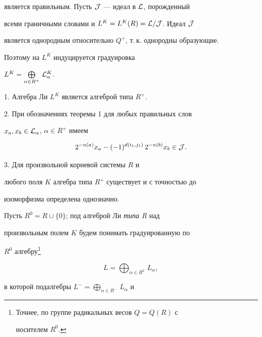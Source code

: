 является правильным. Пусть $\cal J$ --- идеал в $\cal L$, порожденный


всеми граничными словами и $L^K=L^K(R)=\cal L/J$. Идеал $\cal J$


является однородным относительно $Q^+$, т.\,к. однородны образующие.


Поэтому на $L^K$ индуцируется градуировка


$L^K=\bigoplus\limits_{\alpha\in R^+}\,{\cal L}_\alpha^K$.





\begin{cor}


1. Алгебра Ли $L^K$ является алгеброй типа $R^+$.





2. При обозначениях теоремы 1 для любых правильных слов


$x_a,x_b\in {\cal L}_\alpha$, $\alpha\in R^+$ имеем


$$


2^{-u(a)}x_a-(-1)^{d(i_1,j_1)}\,2^{-u(b)}x_b\in{\cal J}.


$$





3. Для произвольной корневой системы $R$ и


любого поля $K$ алгебра типа $R^+$ существует и с точностью до


изоморфизма определена однозначно.


\end{cor}


\addtocounter{footnote}{-1}





Пусть $R^0=R\cup \{0\}$; под алгеброй Ли {\it типа R} над


произвольным полем $K$ будем понимать градуированную по


$R^0$ алгебру\footnote{Точнее, по группе радикальных весов $Q=Q(R)$ с


носителем $R^0$.} 


\begin{equation}


L=\bigoplus_{\alpha\in R^0}\,L_\alpha,


\end{equation}


в которой подалгебры $L^-=\bigoplus\limits_{\alpha\in R^-}\,L_\alpha$ и


